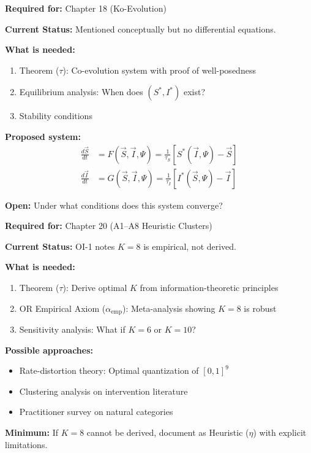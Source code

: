 \begin{tcolorbox}[colback=green!5!white, colframe=green!75!black,
    title=\textbf{TODO-UNMAPPED_IE-8: Co-Evolution Dynamics $\frac{d\vec{S}}{dt}, \frac{d\vec{I}}{dt}$}]

\textbf{Required for:} Chapter 18 (Ko-Evolution)

\textbf{Current Status:} Mentioned conceptually but no differential equations.

\textbf{What is needed:}
\begin{enumerate}[nosep]
    \item Theorem ($\tau$): Co-evolution system with proof of well-posedness
    \item Equilibrium analysis: When does $(S^*, I^*)$ exist?
    \item Stability conditions
\end{enumerate}

\textbf{Proposed system:}
\begin{align}
\frac{d\vec{S}}{dt} &= F(\vec{S}, \vec{I}, \Psi) = \frac{1}{\tau_S}[S^*(\vec{I}, \Psi) - \vec{S}] \\
\frac{d\vec{I}}{dt} &= G(\vec{S}, \vec{I}, \Psi) = \frac{1}{\tau_I}[I^*(\vec{S}, \Psi) - \vec{I}]
\end{align}

\textbf{Open:} Under what conditions does this system converge?

\end{tcolorbox}

\begin{tcolorbox}[colback=green!5!white, colframe=green!75!black,
    title=\textbf{TODO-UNMAPPED_IE-9: Cluster Emergence Theorem (K=8)}]

\textbf{Required for:} Chapter 20 (A1--A8 Heuristic Clusters)

\textbf{Current Status:} OI-1 notes $K=8$ is empirical, not derived.

\textbf{What is needed:}
\begin{enumerate}[nosep]
    \item Theorem ($\tau$): Derive optimal $K$ from information-theoretic principles
    \item OR Empirical Axiom ($\alpha_{\text{emp}}$): Meta-analysis showing $K=8$ is robust
    \item Sensitivity analysis: What if $K=6$ or $K=10$?
\end{enumerate}

\textbf{Possible approaches:}
\begin{itemize}[nosep]
    \item Rate-distortion theory: Optimal quantization of $[0,1]^9$
    \item Clustering analysis on intervention literature
    \item Practitioner survey on natural categories
\end{itemize}

\textbf{Minimum:} If $K=8$ cannot be derived, document as Heuristic ($\eta$) with explicit limitations.

\end{tcolorbox}

